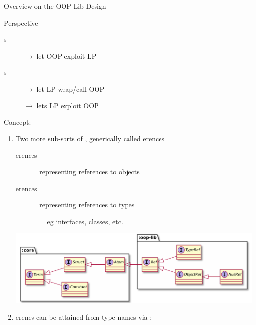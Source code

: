 \documentclass[handout]{beamer}
\begin{document}
\begin{frame}[allowframebreaks]{Overview on the OOP Lib Design}

    \begin{block}{Perspective}
        \begin{description}
            \item[s] $\rightarrow$ let OOP exploit LP
            \item[s] $\rightarrow$ let LP wrap/call OOP 
            \item[] $\rightarrow$ \alert{lets LP exploit OOP}
        \end{description}
    \end{block}

    \framebreak

    Concept:
    \bigskip
    \begin{enumerate}
        \item Two more sub-sorts of , generically called \alert{erences}
        \begin{description}
            \item[erences] | representing references to \alert{objects}
            \item[erences] | representing references to \alert{type}s
            \begin{itemize}
                \item[eg] interfaces, classes, etc.
            \end{itemize} 
        \end{description}
        \begin{center}
            \includegraphics[width=\linewidth]{img/refs.pdf}
        \end{center}

        \framebreak

        \item {}erenes can be attained from type names via :


\end{enumerate}
\end{frame}
\end{document}

